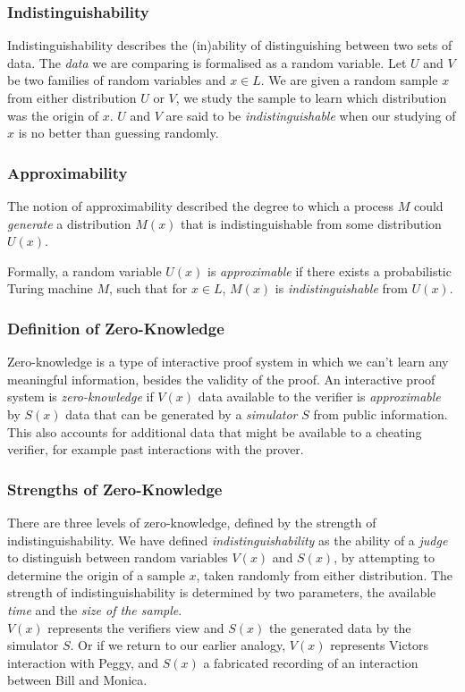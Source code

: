 \subsubsection{Indistinguishability}
Indistinguishability describes the (in)ability of distinguishing between two sets of data. The \textit{data} we are comparing is formalised as a random variable.
\bigskip
\newline
Let $U$ and $V$ be two families of random variables and $x \in L$.
We are given a random sample $x$ from either distribution $U$ or $V$, we study the sample to learn which distribution was the origin of $x$.
$U$ and $V$ are said to be \textit{indistinguishable} when our studying of $x$ is no better than guessing randomly.

\subsubsection{Approximability}

The notion of approximability described the degree to which a process $M$ could \textit{generate} a distribution $M(x)$ that is indistinguishable from some distribution $U(x)$.

Formally, a random variable $U(x)$ is \textit{approximable} if there exists a probabilistic Turing machine $M$, such that for $x \in L$, $M(x)$ is \textit{indistinguishable} from $U(x)$.


\subsubsection{Definition of Zero-Knowledge}
Zero-knowledge is a type of interactive proof system in which we can’t learn any meaningful information, besides the validity of the proof.
\bigskip
\newline
An interactive proof system is \textit{zero-knowledge} if $V(x)$ data available to the verifier is \textit{approximable} by $S(x)$ data that can be generated by a \textit{simulator} $S$ from public information.
This also accounts for additional data that might be available to a cheating verifier, for example past interactions with the prover.

\subsubsection{Strengths of Zero-Knowledge}
There are three levels of zero-knowledge, defined by the strength of indistinguishability.
We have defined \textit{indistinguishability} as the ability of a \textit{judge} to distinguish between random variables $V(x)$ and $S(x)$, by attempting to determine the origin of a sample $x$, taken randomly from either distribution.
The strength of indistinguishability is determined by two parameters, the available \textit{time} and the \textit{size of the sample}.\\
\newline
$V(x)$ represents the verifiers view and $S(x)$ the generated data by the simulator $S$. Or if we return to our earlier analogy, $V(x)$ represents Victors interaction with Peggy, and $S(x)$ a fabricated recording of an interaction between Bill and Monica.

